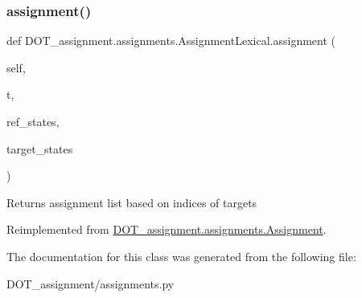 \subsubsection{\texorpdfstring{assignment()}{assignment()}}
{\footnotesize\ttfamily def D\+O\+T\+\_\+assignment.\+assignments.\+Assignment\+Lexical.\+assignment (\begin{DoxyParamCaption}\item[{}]{self,  }\item[{}]{t,  }\item[{}]{ref\+\_\+states,  }\item[{}]{target\+\_\+states }\end{DoxyParamCaption})}

\begin{DoxyVerb}Returns assignment list based on indices of targets
\end{DoxyVerb}
 

Reimplemented from \mbox{\hyperlink{class_d_o_t__assignment_1_1assignments_1_1_assignment}{D\+O\+T\+\_\+assignment.\+assignments.\+Assignment}}.



The documentation for this class was generated from the following file\+:\begin{DoxyCompactItemize}
\item 
D\+O\+T\+\_\+assignment/assignments.\+py\end{DoxyCompactItemize}
